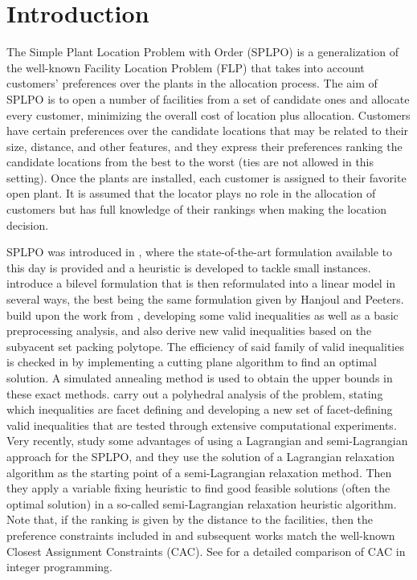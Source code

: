 \documentclass[preprint,11pt,authoryear]{elsarticle}
\begin{document}
\section{Introduction} \label{sec:intro}
The Simple Plant Location Problem with Order (SPLPO) is a generalization of the well-known Facility Location Problem (FLP) that takes into account customers' preferences over the plants in the allocation process. The aim of SPLPO is to open a number of facilities from a set of candidate ones and allocate every customer, minimizing the overall cost of location plus allocation. Customers have certain preferences over the candidate locations that may be related to their size, distance, and other features, and they express their preferences ranking the candidate locations from the best to the worst (ties are not allowed in this setting). Once the plants are installed, each customer is assigned to their favorite open plant. It is assumed that the locator plays no role in the allocation of customers but has full knowledge of their rankings when making the location decision.

SPLPO was introduced in \cite{hanjoul1987}, where the state-of-the-art formulation available to this day is provided and a heuristic is developed to tackle small instances. \cite{hansen2004} introduce a bilevel formulation that is then reformulated into a linear model in several ways, the best being the same formulation given by Hanjoul and Peeters. \cite{canovas2007} build upon the work from \cite{hanjoul1987}, developing some valid inequalities as well as a basic preprocessing analysis, and \cite{vasil2009} also derive new valid inequalities based on the subyacent set packing polytope. The efficiency of said family of valid inequalities is checked in \cite{vasilyev2010} by implementing a cutting plane algorithm to find an optimal solution. A simulated annealing method is used to obtain the upper bounds in these exact methods. \cite{vasilyev2013} carry out a polyhedral analysis of the problem, stating which inequalities are facet defining and developing a new set of facet-defining valid inequalities that are tested through extensive computational experiments. Very recently, \cite{cabezas2023} study some advantages of using a Lagrangian and semi-Lagrangian approach for the SPLPO, and they use the solution of a Lagrangian relaxation algorithm as the starting point of a semi-Lagrangian relaxation method. Then they apply a variable fixing heuristic to find good feasible solutions (often the optimal solution) in a so-called semi-Lagrangian relaxation heuristic algorithm. Note that, if the ranking is given by the distance to the facilities, then the preference constraints included in \cite{hanjoul1987} and subsequent works match the well-known Closest Assignment Constraints (CAC). See \cite{espejo2012} for a detailed comparison of CAC in integer programming.
\end{document}
